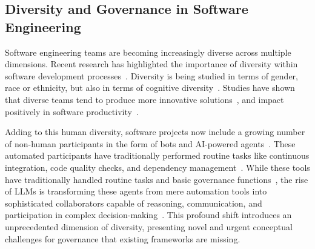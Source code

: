 
\subsection{Diversity and Governance in Software Engineering}

Software engineering teams are becoming increasingly diverse across multiple dimensions.
Recent research has highlighted the importance of diversity within software development processes~\cite{bjorn2023diversity,DBLP:journals/ese/Rodriguez-Perez21}.
Diversity is being studied in terms of gender, race or ethnicity, but also in terms of cognitive diversity~\cite{DBLP:journals/corr/abs-2503-05470,DBLP:conf/icse/DuttaCST23}.
Studies have shown that diverse teams tend to produce more innovative solutions~\cite{DBLP:conf/icse/CatolinoPTSF19,doi:10.1073/pnas.2200841119}, and impact positively in software productivity~\cite{DBLP:conf/chi/VasilescuPRBSDF15}.

Adding to this human diversity, software projects now include a growing number of non-human participants in the form of bots and AI-powered agents~\cite{DBLP:journals/pacmhci/WesselSSWPCG18,DBLP:conf/xpu/RasheedWSKA0SA24}.
These automated participants have traditionally performed routine tasks like continuous integration, code quality checks, and dependency management~\cite{DBLP:conf/msr/KinsmanWGT21}.
While these tools have traditionally handled routine tasks and basic governance functions~\cite{DBLP:journals/ese/WesselVGT23,DBLP:conf/icsm/DecanMMG22}, %
the rise of LLMs is transforming these agents from mere automation tools into sophisticated collaborators capable of reasoning, communication, and participation in complex decision-making~\cite{xi2025rise, DBLP:conf/ijcai/GuoCWCPCW024}. 
This profound shift introduces an unprecedented dimension of diversity, presenting novel and urgent conceptual challenges for governance that existing frameworks are missing.

